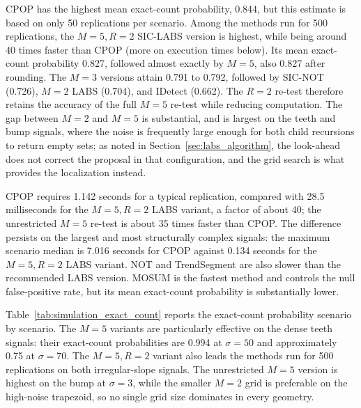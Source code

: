 \documentclass[12pt, a4paper]{article}
\begin{document}
CPOP has the highest mean exact-count probability, 0.844, but this estimate is
based on only 50 replications per scenario.  Among the methods run for 500
replications, the $M=5,R=2$ SIC-LABS version is highest, while being around 40 times faster than CPOP (more on execution times below). Its mean exact-count
probability 0.827, followed almost exactly by $M=5$, also 0.827 after rounding.
The $M=3$ versions attain 0.791 to 0.792, followed by SIC-NOT (0.726), $M=2$
LABS (0.704), and IDetect (0.662).  The $R=2$ re-test therefore retains the
accuracy of the full $M=5$ re-test while reducing computation.  The gap between
$M=2$ and $M=5$ is substantial, and is largest on the teeth and bump signals,
where the noise is frequently large enough for both child recursions to return
empty sets; as noted in Section~\ref{sec:labs_algorithm}, the look-ahead does
not correct the proposal in that configuration, and the grid search is what
provides the localization instead.

CPOP requires 1.142 seconds for a typical replication, compared with 28.5
milliseconds for the $M=5,R=2$ LABS variant, a factor of about 40; the
unrestricted $M=5$ re-test is about 35 times faster than CPOP.  The difference
persists on the largest and most structurally complex signals: the maximum
scenario median is 7.016 seconds for CPOP against 0.134 seconds for the
$M=5,R=2$ LABS variant.  NOT and TrendSegment are also slower than the
recommended LABS version.  MOSUM is the fastest method and controls the null
false-positive rate, but its mean exact-count probability is substantially
lower.

Table~\ref{tab:simulation_exact_count} reports the exact-count probability
scenario by scenario.  The $M=5$ variants are particularly effective on the
dense teeth signals: their exact-count probabilities are 0.994 at
$\sigma=50$ and approximately 0.75 at $\sigma=70$.  The $M=5,R=2$ variant also
leads the methods run for 500 replications on both irregular-slope signals.
The unrestricted $M=5$ version is highest on the bump at $\sigma=3$, while
the smaller $M=2$ grid is preferable on the high-noise trapezoid, so no single
grid size dominates in every geometry.
\end{document}
